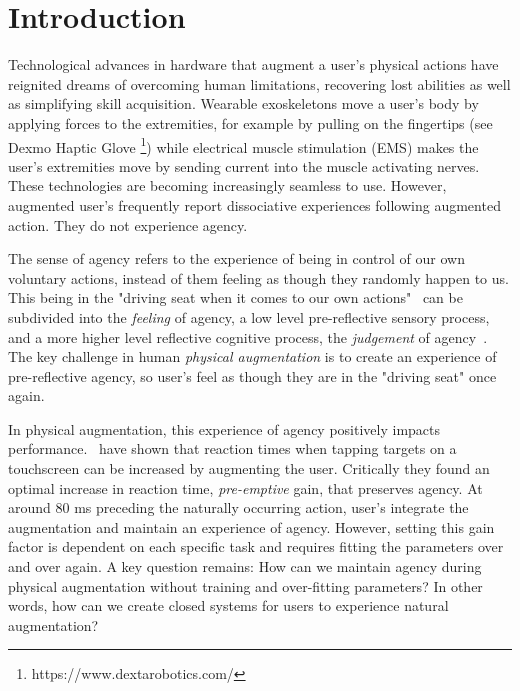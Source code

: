 \section{Introduction}
Technological advances in hardware that augment a user's physical actions have reignited dreams of overcoming human limitations, recovering lost abilities as well as simplifying skill acquisition. Wearable exoskeletons move a user's body by applying forces to the extremities, for example by pulling on the fingertips (see Dexmo Haptic Glove \footnote{https://www.dextarobotics.com/}) while electrical muscle stimulation (EMS) makes the user's extremities move by sending current into the muscle activating nerves. These technologies are becoming increasingly seamless to use. However, augmented user's frequently report dissociative experiences following augmented action. They do not experience agency.

The sense of agency refers to the experience of being in control of our own voluntary actions, instead of them feeling as though they randomly happen to us. This being in the "driving seat when it comes to our own actions"~\cite{Moore2016-ub} can be subdivided into the \textit{feeling} of agency, a low level pre-reflective sensory process, and a more higher level reflective cognitive process, the \textit{judgement} of agency~\cite{Moore2016-ub, Danry2022-xk}. The key challenge in human \textit{physical augmentation} is to create an experience of pre-reflective agency, so user's feel as though they are in the "driving seat" once again.

In physical augmentation, this experience of agency positively impacts performance.~\citet{Kasahara2019-sk} have shown that reaction times when tapping targets on a touchscreen can be increased by augmenting the user. Critically they found an optimal increase in reaction time, \textit{pre-emptive} gain, that preserves agency. At around 80 ms preceding the naturally occurring action, user's integrate the augmentation and maintain an experience of agency. However, setting this gain factor is dependent on each specific task and requires fitting the parameters over and over again. A key question remains: How can we maintain agency during physical augmentation without training and over-fitting parameters? In other words, how can we create closed systems for users to experience natural augmentation?

